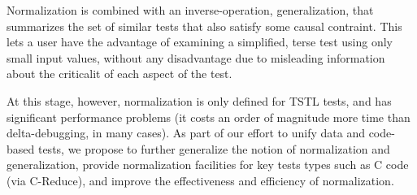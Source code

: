 Normalization is combined with an inverse-operation, generalization,
that summarizes the set of similar tests that also satisfy some causal
contraint.  This lets a user have the advantage of examining a
simplified, terse test using only small input values, without any
disadvantage due to misleading information about the criticalit of
each aspect of the test.

At this stage, however, normalization is only defined for TSTL tests,
and has significant performance problems (it costs an order of
magnitude more time than delta-debugging, in many cases).  As part of
our effort to unify data and code-based tests, we propose to further
generalize the notion of normalization and generalization, provide
normalization facilities for key tests types such as C code (via
C-Reduce), and improve the effectiveness and efficiency of normalization.
